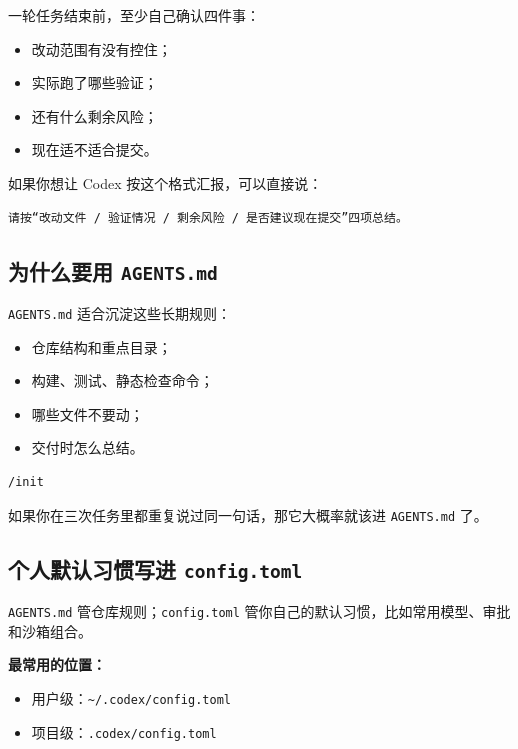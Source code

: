\documentclass[UTF8,a4paper,11pt]{ctexart}
\begin{document}
一轮任务结束前，至少自己确认四件事：
\begin{itemize}
  \item 改动范围有没有控住；
  \item 实际跑了哪些验证；
  \item 还有什么剩余风险；
  \item 现在适不适合提交。
\end{itemize}

如果你想让 Codex 按这个格式汇报，可以直接说：

\begin{lstlisting}[style=prompt]
请按“改动文件 / 验证情况 / 剩余风险 / 是否建议现在提交”四项总结。
\end{lstlisting}

\subsection{为什么要用 \texttt{AGENTS.md}}

\texttt{AGENTS.md} 适合沉淀这些长期规则：
\begin{itemize}
  \item 仓库结构和重点目录；
  \item 构建、测试、静态检查命令；
  \item 哪些文件不要动；
  \item 交付时怎么总结。
\end{itemize}

\begin{lstlisting}[style=cli]
/init
\end{lstlisting}

\begin{tipbox}
如果你在三次任务里都重复说过同一句话，那它大概率就该进 \texttt{AGENTS.md} 了。
\end{tipbox}

\subsection{个人默认习惯写进 \texttt{config.toml}}

\texttt{AGENTS.md} 管仓库规则；\texttt{config.toml} 管你自己的默认习惯，比如常用模型、审批和沙箱组合。

\textbf{最常用的位置：}
\begin{itemize}
  \item 用户级：\texttt{\textasciitilde/.codex/config.toml}
  \item 项目级：\texttt{.codex/config.toml}
\end{itemize}
\end{document}

